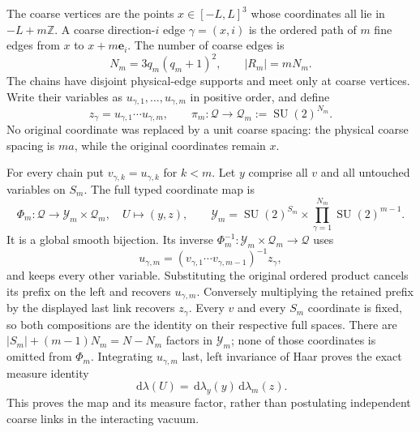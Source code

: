 \documentclass[11pt]{article}
\newcommand{\SU}{\operatorname{SU}}
\newcommand{\dd}{\,\mathrm d}
\begin{document}
The coarse vertices are the points
$x\in[-L,L]^3$ whose coordinates all lie in $-L+m\mathbb Z$.
A coarse direction-$i$ edge $\gamma=(x,i)$ is the ordered path of $m$
fine edges from $x$ to $x+m\mathbf e_i$. The number of coarse edges is
\[
 N_m=3q_m(q_m+1)^2,\qquad |R_m|=mN_m.
\]
The chains have disjoint physical-edge supports and meet only at coarse
vertices. Write their variables as $u_{\gamma,1},\ldots,u_{\gamma,m}$
in positive order, and define
\begin{equation}\label{eq:path}
 z_\gamma=u_{\gamma,1}\cdots u_{\gamma,m},\qquad
 \pi_m:\mathcal Q\longrightarrow\mathcal Q_m:=\SU(2)^{N_m}.
\end{equation}
No original coordinate was replaced by a unit coarse spacing: the physical
coarse spacing is $ma$, while the original coordinates remain $x$.

For every chain put $v_{\gamma,k}=u_{\gamma,k}$ for $k<m$.
Let $y$ comprise all $v$ and all untouched variables on $S_m$.
The full typed coordinate map is
\[
 \Phi_m:\mathcal Q\longrightarrow\mathcal Y_m\times\mathcal Q_m,
 \quad U\longmapsto(y,z),\qquad
 \mathcal Y_m=\SU(2)^{S_m}\times
                \prod_{\gamma=1}^{N_m}\SU(2)^{m-1}.
\]
It is a global smooth bijection. Its inverse
$\Phi_m^{-1}:\mathcal Y_m\times\mathcal Q_m\to\mathcal Q$ uses
\[
 u_{\gamma,m}=(v_{\gamma,1}\cdots v_{\gamma,m-1})^{-1}z_\gamma,
\]
and keeps every other variable. Substituting the original ordered
product cancels its prefix on the left and recovers $u_{\gamma,m}$.
Conversely multiplying the retained prefix by the displayed last link
recovers $z_\gamma$. Every $v$ and every $S_m$ coordinate is fixed,
so both compositions are the identity on their respective full spaces.
There are $|S_m|+(m-1)N_m=N-N_m$ factors in $\mathcal Y_m$;
none of those coordinates is omitted from $\Phi_m$.
Integrating $u_{\gamma,m}$ last,
left invariance of Haar proves the exact measure identity
\begin{equation}\label{eq:haarcoordinates}
 \dd\lambda(U)=\dd\lambda_y(y)\dd\lambda_m(z).
\end{equation}
This proves the map and its measure factor, rather than postulating
independent coarse links in the interacting vacuum.
\end{document}
